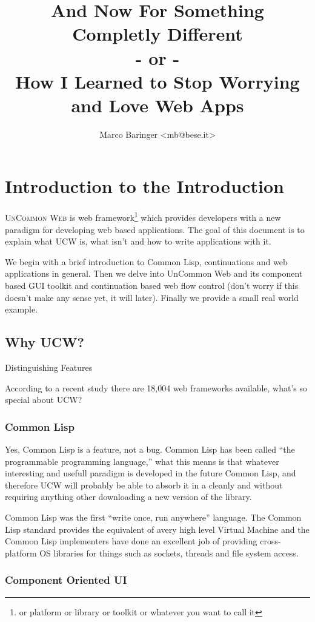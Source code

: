 \documentclass[a4paper]{article}
\title{And Now For Something Completly Different \\
- or -\\
How I Learned to Stop Worrying and Love Web Apps}
\author{Marco Baringer <mb@bese.it>}
\date{}
\newcommand{\ucw}{\textsc{UCW}}
\newcommand{\UCW}{\textsc{UnCommon Web}}
\begin{document}
\maketitle

\tableofcontents

\section{Introduction to the Introduction}

\UCW{} is web framework\footnote{or platform or library or toolkit or
  whatever you want to call it} which provides developers with a new
paradigm for developing web based applications. The goal of this
document is to explain what \ucw{} is, what isn't and how to write
applications with it.

We begin with a brief introduction to Common Lisp, continuations and
web applications in general. Then we delve into UnCommon Web and its
component based GUI toolkit and continuation based web flow control
(don't worry if this doesn't make any sense yet, it will
later). Finally we provide a small real world example.

\subsection{Why \ucw{}?}{Distinguishing Features}

According to a recent study there are 18,004 web frameworks available,
what's so special about \ucw{}?

\subsubsection{Common Lisp}

Yes, Common Lisp is a feature, not a bug. Common Lisp has been called
``the programmable programming language,'' what this means is that
whatever interesting and usefull paradigm is developed in the future
Common Lisp, and therefore \ucw{} will probably be able to absorb it
in a cleanly and without requiring anything other downloading a new
version of the library.

Common Lisp was the first ``write once, run anywhere'' language. The
Common Lisp standard provides the equivalent of avery high level
Virtual Machine and the Common Lisp implementers have done an
excellent job of providing cross-platform OS libraries for things such
as sockets, threads and file system access.

\subsubsection{Component Oriented UI}
\end{document}
